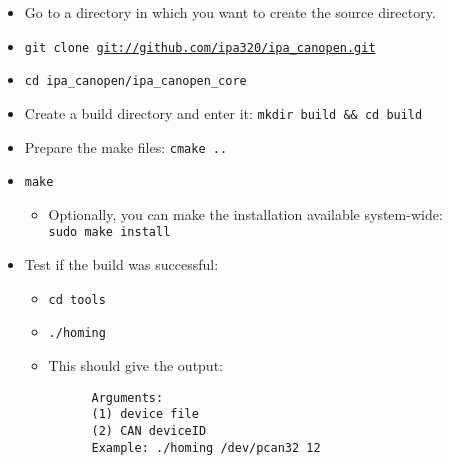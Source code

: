 \begin{itemize}
\item Go to a directory in which you want to create the source directory.
\item \texttt{git clone \url{git://github.com/ipa320/ipa_canopen.git}}
\item \texttt{cd ipa\_canopen/ipa\_canopen\_core}
\item Create a build directory and enter it: \texttt{mkdir build \&\& cd build}
\item Prepare the make files: \texttt{cmake ..}
\item \texttt{make}
\begin{itemize}
\item Optionally, you can make the installation available system-wide: \\
\texttt{sudo make install}
\end{itemize}
\item Test if the build was successful:
\begin{itemize} 
\item \texttt{cd tools}
\item \texttt{./homing}
\item This should give the output:
{\scriptsize
\begin{verbatim}
      Arguments:
      (1) device file
      (2) CAN deviceID
      Example: ./homing /dev/pcan32 12
\end{verbatim}}
\end{itemize}
\end{itemize}

